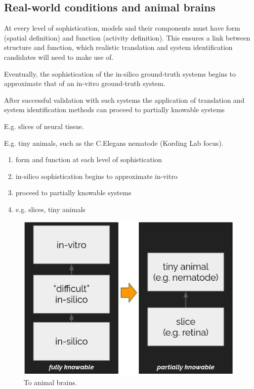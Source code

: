 \documentclass{ldr-article}
\begin{document}
\subsection{Real-world conditions and animal brains}

At every level of sophistication, models and their components must have form (spatial definition) and function (activity definition). This ensures a link between structure and function, which realistic translation and system identification candidates will need to make use of.

Eventually, the sophistication of the in-silico ground-truth systems begins to approximate that of an in-vitro ground-truth system.

After successful validation with such systems the application of translation and system identification methods can proceed to partially knowable systems

E.g. slices of neural tissue.

E.g. tiny animals, such as the C.Elegans nematode (Kording Lab focus).

\begin{enumerate}
	\item form and function at each level of sophistication
	\item in-silico sophistication begins to approximate in-vitro
	\item proceed to partially knowable systems
	\item e.g. slices, tiny animals
\end{enumerate}

\begin{figure}
	\centering
	\includegraphics[width=1\linewidth]{figures/to-animal-brains.jpg}
	\caption{To animal brains.}
	\label{fig:to-animal-brains}
\end{figure}
\end{document}

